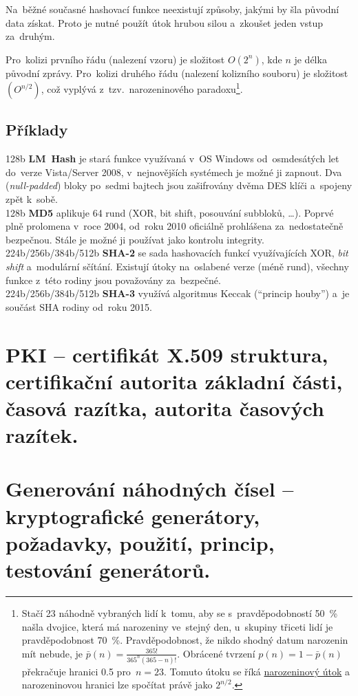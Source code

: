 Na~běžné současné hashovací funkce neexistují způsoby, jakými by šla původní data získat. Proto je nutné použít útok hrubou silou a~zkoušet jeden vstup za~druhým. %

Pro~kolizi prvního řádu (nalezení vzoru) je složitost $O(2^n)$, kde $n$ je délka původní zprávy. Pro~kolizi druhého řádu (nalezení kolizního souboru) je složitost $(O^{n/2})$, což vyplývá z~tzv.~narozeninového paradoxu\footnote{
Stačí 23 náhodně vybraných lidí k~tomu, aby se s~pravděpodobností 50~\% našla dvojice, která má narozeniny ve~stejný den, u~skupiny třiceti lidí je pravděpodobnost 70~\%. Pravděpodobnost, že nikdo shodný datum narozenin mít nebude, je $\bar{p}(n) = \frac{365!}{365^n(365 - n)!}$. Obrácené tvrzení $p(n) = 1 - \bar{p}(n)$ překračuje hranici 0.5 pro~$n=23$.
Tomuto útoku se říká \href{https://cs.wikipedia.org/wiki/Narozeninový_útok}{narozeninový útok} a narozeninovou hranici lze spočítat právě jako $2^{n/2}$.
}.

\subsection{Příklady}

128b \textbf{LM~Hash} je stará funkce využívaná v~OS Windows od~osmdesátých let do~verze Vista/Server 2008, v~nejnovějších systémech je možné ji zapnout. Dva (\emph{null-padded}) bloky po~sedmi bajtech jsou zašifrovány dvěma DES klíči a~spojeny zpět k~sobě. \\
128b \textbf{MD5} aplikuje 64 rund (XOR, bit shift, posouvání subbloků, \dots). Poprvé plně prolomena v~roce 2004, od~roku 2010 oficiálně prohlášena za~nedostatečně bezpečnou. Stále je možné ji používat jako kontrolu integrity. \\
224b/256b/384b/512b \textbf{SHA-2} se sada hashovacích funkcí využívajících XOR, \emph{bit shift} a~modulární sčítání. Existují útoky na~oslabené verze (méně rund), všechny funkce z~této rodiny jsou považovány za~bezpečné. \\
224b/256b/384b/512b \textbf{SHA-3} využívá algoritmus Keccak (\enquote{princip houby}) a~je součást SHA rodiny od~roku 2015.

\clearpage
\section{PKI -- certifikát X.509 struktura, certifikační autorita základní části, časová razítka, autorita časových razítek.}

\clearpage
\section{Generování náhodných čísel -- kryptografické generátory, požadavky, použití, princip, testování generátorů.}

